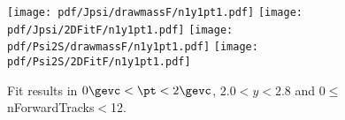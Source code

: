 \begin{figure}[H]
\begin{center}
\texttt{[image: pdf/Jpsi/drawmassF/n1y1pt1.pdf]}
\texttt{[image: pdf/Jpsi/2DFitF/n1y1pt1.pdf]}
\vspace*{-0.5cm}
\texttt{[image: pdf/Psi2S/drawmassF/n1y1pt1.pdf]}
\texttt{[image: pdf/Psi2S/2DFitF/n1y1pt1.pdf]}
\vspace*{-0.5cm}
\end{center}
\caption{Fit results in $0\gevc<\pt<2\gevc$, $2.0<y<2.8$ and 0$\leq$nForwardTracks$<$12.}
\label{Fitn1y1pt1}
\end{figure}

